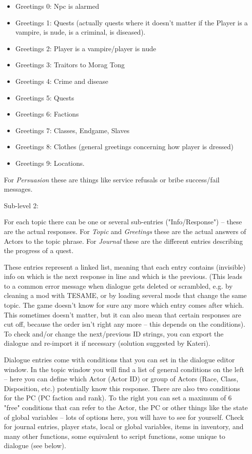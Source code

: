 \documentclass[
]{article}
\begin{document}
\begin{itemize}
\item
  Greetings 0: Npc is alarmed
\item
  Greetings 1: Quests (actually quests where it doesn't matter if the
  Player is a vampire, is nude, is a criminal, is diseased).
\item
  Greetings 2: Player is a vampire/player is nude
\item
  Greetings 3: Traitors to Morag Tong
\item
  Greetings 4: Crime and disease
\item
  Greetings 5: Quests
\item
  Greetings 6: Factions
\item
  Greetings 7: Classes, Endgame, Slaves
\item
  Greetings 8: Clothes (general greetings concerning how player is
  dressed)
\item
  Greetings 9: Locations.
\end{itemize}

For \emph{Persuasion} these are things like service refusals or bribe
success/fail messages.

Sub-level 2:

For each topic there can be one or several sub-entries ("Info/Response")
-- these are the actual responses. For \emph{Topic} and \emph{Greetings}
these are the actual answers of Actors to the topic phrase. For
\emph{Journal} these are the different entries describing the progress
of a quest.

These entries represent a linked list, meaning that each entry contains
(invisible) info on which is the next response in line and which is the
previous. (This leads to a common error message when dialogue gets
deleted or scrambled, e.g. by cleaning a mod with TESAME, or by loading
several mods that change the same topic. The game doesn't know for sure
any more which entry comes after which. This sometimes doesn't matter,
but it can also mean that certain responses are cut off, because the
order isn't right any more -- this depends on the conditions). To check
and/or change the next/previous ID strings, you can export the dialogue
and re-import it if necessary (solution suggested by Kateri).

Dialogue entries come with conditions that you can set in the dialogue
editor window. In the topic window you will find a list of general
conditions on the left -- here you can define which Actor (Actor ID) or
group of Actors (Race, Class, Disposition, etc.) potentially know this
response. There are also two conditions for the PC (PC faction and
rank). To the right you can set a maximum of 6 "free" conditions that
can refer to the Actor, the PC or other things like the state of global
variables -- lots of options here, you will have to see for yourself.
Check for journal entries, player stats, local or global variables,
items in inventory, and many other functions, some equivalent to script
functions, some unique to dialogue (see below).
\end{document}
